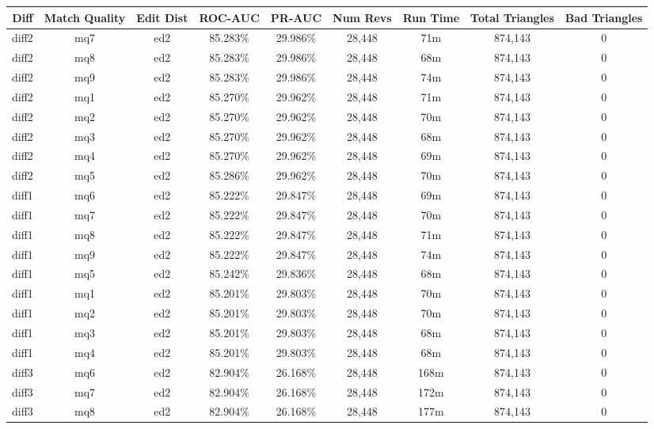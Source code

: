 \begin{sidewaystable}[!tp]
  \begin{center}
    \begin{tabular}{|c|c|c||c|c||c|c|c|c|}
\hline
Diff & Match Quality & Edit Dist
        & ROC-AUC & PR-AUC
        & Num Revs & Run Time
        & Total Triangles & Bad Triangles \\
\hline
\hline
diff2 & mq7 & ed2 & 85.283\% & 29.986\% & 28,448 & 71m & 874,143 & 0 \\
diff2 & mq8 & ed2 & 85.283\% & 29.986\% & 28,448 & 68m & 874,143 & 0 \\
diff2 & mq9 & ed2 & 85.283\% & 29.986\% & 28,448 & 74m & 874,143 & 0 \\
diff2 & mq1 & ed2 & 85.270\% & 29.962\% & 28,448 & 71m & 874,143 & 0 \\
diff2 & mq2 & ed2 & 85.270\% & 29.962\% & 28,448 & 70m & 874,143 & 0 \\
diff2 & mq3 & ed2 & 85.270\% & 29.962\% & 28,448 & 68m & 874,143 & 0 \\
diff2 & mq4 & ed2 & 85.270\% & 29.962\% & 28,448 & 69m & 874,143 & 0 \\
diff2 & mq5 & ed2 & 85.286\% & 29.962\% & 28,448 & 70m & 874,143 & 0 \\
diff1 & mq6 & ed2 & 85.222\% & 29.847\% & 28,448 & 69m & 874,143 & 0 \\
diff1 & mq7 & ed2 & 85.222\% & 29.847\% & 28,448 & 70m & 874,143 & 0 \\
diff1 & mq8 & ed2 & 85.222\% & 29.847\% & 28,448 & 71m & 874,143 & 0 \\
diff1 & mq9 & ed2 & 85.222\% & 29.847\% & 28,448 & 74m & 874,143 & 0 \\
diff1 & mq5 & ed2 & 85.242\% & 29.836\% & 28,448 & 68m & 874,143 & 0 \\
diff1 & mq1 & ed2 & 85.201\% & 29.803\% & 28,448 & 70m & 874,143 & 0 \\
diff1 & mq2 & ed2 & 85.201\% & 29.803\% & 28,448 & 70m & 874,143 & 0 \\
diff1 & mq3 & ed2 & 85.201\% & 29.803\% & 28,448 & 68m & 874,143 & 0 \\
diff1 & mq4 & ed2 & 85.201\% & 29.803\% & 28,448 & 68m & 874,143 & 0 \\
diff3 & mq6 & ed2 & 82.904\% & 26.168\% & 28,448 & 168m & 874,143 & 0 \\
diff3 & mq7 & ed2 & 82.904\% & 26.168\% & 28,448 & 172m & 874,143 & 0 \\
diff3 & mq8 & ed2 & 82.904\% & 26.168\% & 28,448 & 177m & 874,143 & 0 \\

\end{tabular}
\end{center}
\end{sidewaystable}
